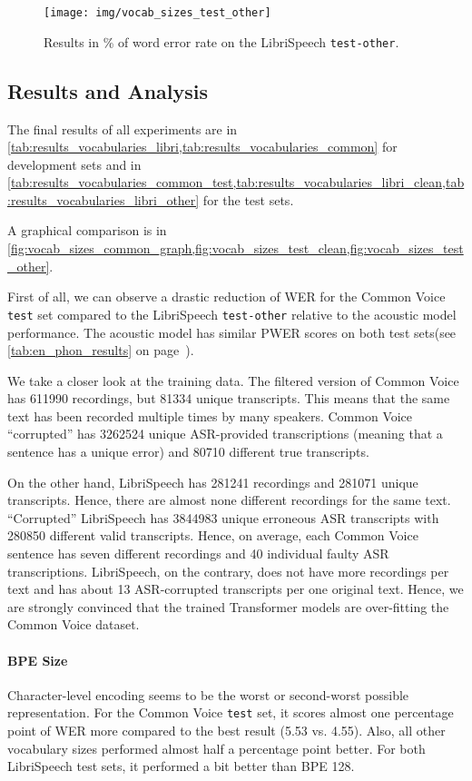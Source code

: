 \begin{figure}[p]
	\centering
	\texttt{[image: img/vocab\_sizes\_test\_other]}
	\caption{Results in \% of word error rate on the LibriSpeech \texttt{test-other}.}
	\label{fig:vocab_sizes_test_other}
\end{figure}



\subsection{Results and Analysis}

The final results of all experiments are in \cref{tab:results_vocabularies_libri,tab:results_vocabularies_common} for development sets and in \cref{tab:results_vocabularies_common_test,tab:results_vocabularies_libri_clean,tab:results_vocabularies_libri_other} for the test sets.

A graphical comparison is in \cref{fig:vocab_sizes_common_graph,fig:vocab_sizes_test_clean,fig:vocab_sizes_test_other}.

First of all, we can observe a drastic reduction of WER for the Common Voice \texttt{test} set compared to the LibriSpeech \texttt{test-other} relative to the acoustic model performance. The acoustic model has similar PWER scores on both test sets(see \cref{tab:en_phon_results} on page~\pageref{tab:en_phon_results}). 

We take a closer look at the training data. The filtered version of Common Voice has 611990 recordings, but 81334 unique transcripts. This means that the same text has been recorded multiple times by many speakers. Common Voice ``corrupted'' has 3262524 unique ASR-provided transcriptions (meaning that a sentence has a unique error) and 80710 different true transcripts.

On the other hand, LibriSpeech has 281241 recordings and 281071 unique transcripts. Hence, there are almost none different recordings for the same text. ``Corrupted'' LibriSpeech has 3844983 unique erroneous ASR transcripts with 280850 different valid transcripts. Hence, on average, each Common Voice sentence has seven different recordings and 40 individual faulty ASR transcriptions. LibriSpeech, on the contrary, does not have more recordings per text and has about 13 ASR-corrupted transcripts per one original text. Hence, we are strongly convinced that the trained Transformer models are over-fitting the Common Voice dataset.

\paragraph{BPE Size}
Character-level encoding seems to be the worst or second-worst possible representation. For the Common Voice \texttt{test} set, it scores almost one percentage point of WER more compared to the best result (5.53 vs. 4.55). Also, all other vocabulary sizes performed almost half a percentage point better. For both LibriSpeech test sets, it performed a bit better than BPE 128. 

